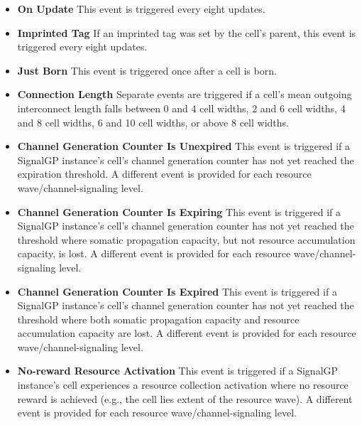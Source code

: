 \begin{itemize}
\item \textbf{On Update}
This event is triggered every eight updates.
\item \textbf{Imprinted Tag}
If an imprinted tag was set by the cell's parent, this event is triggered every eight updates.
\item \textbf{Just Born}
This event is triggered once after a cell is born.
\item \textbf{Connection Length}
Separate events are triggered if a cell's mean outgoing interconnect length falls between 0 and 4 cell widths, 2 and 6 cell widths, 4 and 8 cell widths, 6 and 10 cell widths, or above 8 cell widths.
\item \textbf{Channel Generation Counter Is Unexpired}
This event is triggered if a SignalGP instance's cell's channel generation counter has not yet reached the expiration threshold.
A different event is provided for each resource wave/channel-signaling level.
\item \textbf{Channel Generation Counter Is Expiring}
This event is triggered if a SignalGP instance's cell's channel generation counter has not yet reached the threshold where somatic propagation capacity, but not resource accumulation capacity, is lost.
A different event is provided for each resource wave/channel-signaling level.
\item \textbf{Channel Generation Counter Is Expired}
This event is triggered if a SignalGP instance's cell's channel generation counter has not yet reached the threshold where both somatic propagation capacity and resource accumulation capacity are lost.
A different event is provided for each resource wave/channel-signaling level.
\item \textbf{No-reward Resource Activation}
This event is triggered if a SignalGP instance's cell experiences a resource collection activation where no resource reward is achieved (e.g., the cell lies extent of the resource wave).
A different event is provided for each resource wave/channel-signaling level.
\end{itemize}
